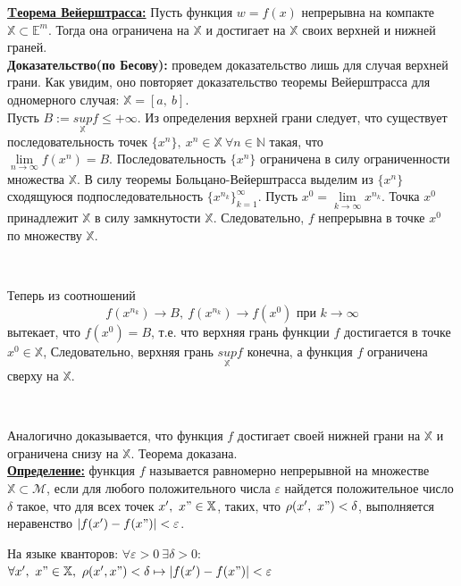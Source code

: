 \documentclass[a4paper,12pt]{article} %
\begin{document}
\underline{\textbf{Tеорема Вейерштрасса:}} Пусть функция $w = f(x)$ непрерывна на
компакте $\mathbb{X} \subset \mathbb{E}^m.$ Тогда она ограничена на $\mathbb{X}$ и достигает на $\mathbb{X}$
своих верхней и нижней граней.\\

\textbf{Доказательство(по Бесову):} проведем доказательство лишь для случая верхней грани. 
Как увидим, оно повторяет доказательство теоремы Вейерштрасса для одномерного случая: $\mathbb{X} = [a, ~b]$.
\\[2mm]Пусть $B := {\underset{\mathbb{X}}{sup}} f \leq +\infty$. Из определения верхней грани следует, что существует
последовательность точек $\{x^{n}\}, ~x^{n} \in \mathbb{X} ~\forall n \in \mathbb{N}$ такая, что 
\\[2mm]$\lim\limits_{n \to \infty}f(x^{n}) = B$. Последовательность $\{x^{n}\}$ ограничена в силу ограниченности
множества $\mathbb{X}$. В силу теоремы Больцано-Вейерштрасса выделим из $\{x^{n}\}$ сходящуюся подпоследовательность 
${\{x^{n_k}\}}_{k = 1}^\infty$. Пусть $x^{0} = \lim\limits_{k \to \infty} x^{n_k}$. Точка $x^{0}$ принадлежит $\mathbb{X}$
в силу замкнутости $\mathbb{X}$. Следовательно, $f$ непрерывна в точке $x^{0}$ по множеству $\mathbb{X}$.

\

Теперь из соотношений 
$$f(x^{n_k}) \to B, ~ f(x^{n_k}) \to f(x^{0}) \text{ при } k \to \infty$$ вытекает, что $f(x^{0}) = B$, т.е. что верхняя
грань функции $f$ достигается в точке $x^{0} \in \mathbb{X}$, Следовательно, верхняя грань $\underset{\mathbb{X}}{sup}f$ конечна,
а функция $f$ ограничена сверху на $\mathbb{X}$.

\

Аналогично доказывается, что функция $f$ достигает своей нижней грани на $\mathbb{X}$ и ограничена снизу на $\mathbb{X}$. Теорема доказана.\\ 

\underline{\textbf{Определение:}} функция $f$ называется равномерно непрерывной на множестве $\mathbb{X} \subset \mathscr{M}$, 
если для любого положительного числа $\varepsilon$ найдется положительное число $\delta$ такое, что
для всех точек $x', ~ x" \in \mathbb{X}$, таких, что $\rho(x', ~x") < \delta$, выполняется неравенство
$|f(x') - f(x")| < \varepsilon$.

На языке кванторов:
$\forall \varepsilon > 0 ~\exists\delta > 0:$ $\forall x', ~x" \in \mathbb{X}, ~\rho(x', x") < \delta \mapsto |f(x') - f(x")| < \varepsilon$\\
\end{document}
